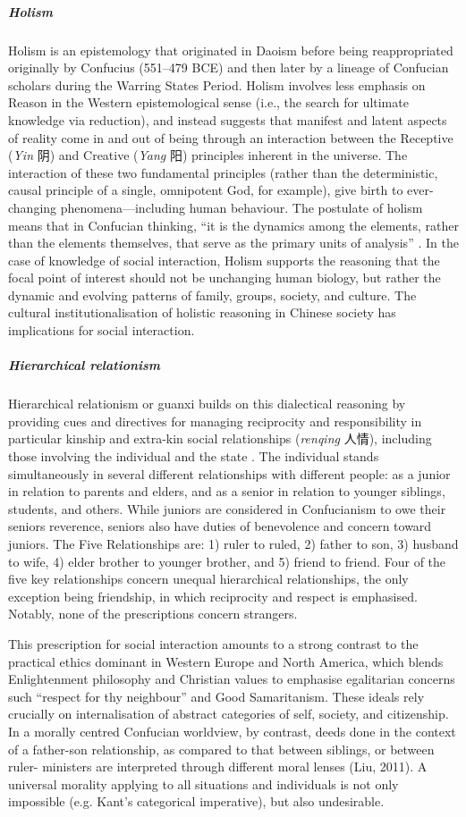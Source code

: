 \begin{CJK}{UTF8}{gbsn}
\subparagraph{Holism}
Holism is an epistemology that originated in Daoism before being reappropriated originally by Confucius (551–479 BCE) and then later by a lineage of Confucian scholars during the Warring States Period.  Holism involves less emphasis on Reason in the Western epistemological sense (i.e., the search for ultimate knowledge via reduction), and instead suggests that manifest and latent aspects of reality come in and out of being through an interaction between the Receptive (\textit{Yin} 阴) and Creative (\textit{Yang} 阳) principles inherent in the universe.  The interaction of these two fundamental principles (rather than the deterministic, causal principle of a single, omnipotent God, for example), give birth to ever-changing phenomena---including human behaviour.  The postulate of holism means that in Confucian thinking, ``it is the dynamics among the elements, rather than the elements themselves, that serve as the primary units of analysis'' \citep[156]{Ji2010}. In the case of knowledge of social interaction, Holism supports the reasoning that the focal point of interest should not be unchanging human biology, but rather the dynamic and evolving patterns of family, groups, society, and culture.  The cultural institutionalisation of holistic reasoning in Chinese society has implications for social interaction.

\subparagraph{Hierarchical relationism}
Hierarchical relationism or guanxi builds on this dialectical reasoning by providing cues and directives for managing reciprocity and responsibility in particular kinship and extra-kin social relationships (\textit{renqing} 人情), including those involving the individual and the state \citep{Maehr1980}.  The individual stands simultaneously in several different relationships with different people: as a junior in relation to parents and elders, and as a senior in relation to younger siblings, students, and others. While juniors are considered in Confucianism to owe their seniors reverence, seniors also have duties of benevolence and concern toward juniors. The Five Relationships are: 1) ruler to ruled, 2) father to son, 3) husband to wife, 4) elder brother to younger brother, and 5) friend to friend. Four of the five key relationships concern unequal hierarchical relationships, the only exception being friendship, in which reciprocity and respect is emphasised.  Notably, none of the prescriptions concern strangers.

This prescription for social interaction amounts to a strong contrast to the practical ethics dominant in Western Europe and North America, which blends Enlightenment philosophy and Christian values to emphasise egalitarian concerns such ``respect for thy neighbour'' and Good Samaritanism. These ideals rely crucially on internalisation of abstract categories of self, society, and citizenship.  In a morally centred Confucian worldview, by contrast, deeds done in the context of a father-son relationship, as compared to that between siblings, or between ruler- ministers are interpreted through different moral lenses (Liu, 2011).  A universal morality applying to all situations and individuals is not only impossible (e.g. Kant’s categorical imperative), but also undesirable.


\end{CJK}
